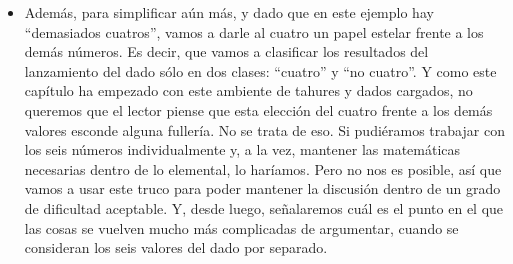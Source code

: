 \begin{itemize}
    \item Además, para simplificar aún más, y dado que en este ejemplo hay  ``demasiados cuatros'', vamos a darle al cuatro un papel estelar frente a los demás números. Es decir, que vamos a clasificar los resultados del lanzamiento del dado sólo en dos clases: ``cuatro'' y ``no cuatro''.  Y como este capítulo ha empezado con este ambiente de tahures y dados cargados, no queremos que el lector piense que esta elección del cuatro frente a los demás valores esconde alguna fullería. No se trata de eso. Si pudiéramos trabajar con los seis números individualmente y, a la vez, mantener las matemáticas necesarias dentro de lo elemental, lo haríamos. Pero no nos es posible, así que vamos a usar este truco para poder mantener la discusión dentro de un grado de dificultad aceptable. Y, desde luego, señalaremos cuál es el punto en el que las cosas se vuelven mucho más complicadas de argumentar, cuando se consideran los seis valores del dado por separado.


\end{itemize}
